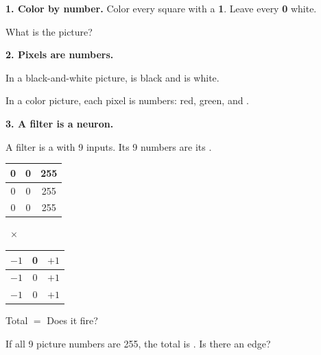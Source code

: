 \documentclass[11pt]{article}
\renewcommand{\arraystretch}{1.5}
\begin{document}
\partner


\vspace{0.3em}
{\large\textbf{1. Color by number.}} Color every square with a \textbf{1}. Leave every \textbf{0} white.

\vspace{0.4em}
\begin{center}\end{center}

\vspace{0.4em}
What is the picture? 

\vspace{0.9em}
{\large\textbf{2. Pixels are numbers.}}

\vspace{0.4em}
In a black-and-white picture,  is black and  is white.

\vspace{0.8em}
In a color picture, each pixel is  numbers: red, green, and .

\newpage
\renewcommand{\arraystretch}{1.25}


{\large\textbf{3. A filter is a neuron.}}

\vspace{0.4em}
A filter is a  with 9 inputs. Its 9 numbers are its .

\vspace{0.6em}
\begin{tabular}{|c|c|c|}
\hline
0 & 0 & 255 \\ \hline
0 & 0 & 255 \\ \hline
0 & 0 & 255 \\ \hline
\end{tabular}
\ $\times$\ 
\begin{tabular}{|c|c|c|}
\hline
$-1$ & 0 & $+1$ \\ \hline
$-1$ & 0 & $+1$ \\ \hline
$-1$ & 0 & $+1$ \\ \hline
\end{tabular}
\qquad Total $=$  \quad Does it fire? 

\vspace{0.6em}
If all 9 picture numbers are 255, the total is . Is there an edge? 
\end{document}
